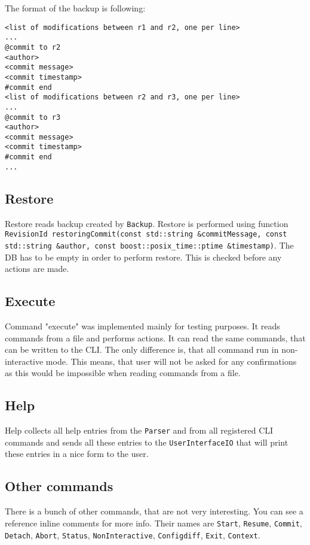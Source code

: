 \documentclass[deska]{subfiles}
\begin{document}
The format of the backup is following:


\begin{verbatim}
<list of modifications between r1 and r2, one per line>
...
@commit to r2
<author>
<commit message>
<commit timestamp>
#commit end
<list of modifications between r2 and r3, one per line>
...
@commit to r3
<author>
<commit message>
<commit timestamp>
#commit end
...
\end{verbatim}

\subsection{Restore}

Restore reads backup created by {\tt Backup}. Restore is performed using function {\tt RevisionId restoringCommit(const
std::string \&commitMessage, const std::string \&author, const boost::posix\_time::ptime \&timestamp)}. The DB has to be empty
in order to perform restore. This is checked before any actions are made.

\subsection{Execute}

Command "execute" was implemented mainly for testing purposes. It reads commands from a file and performs actions. It
can read the same commands, that can be written to the CLI. The only difference is, that all command run in non-interactive
mode. This means, that user will not be asked for any confirmations as this would be impossible when reading commands from
a file.

\subsection{Help}

Help collects all help entries from the {\tt Parser} and from all registered CLI commands and sends all these entries to the
{\tt UserInterfaceIO} that will print these entries in a nice form to the user.

\subsection{Other commands}

There is a bunch of other commands, that are not very interesting. You can see a reference inline comments for more info.
Their names are {\tt Start}, {\tt Resume}, {\tt Commit}, {\tt Detach}, {\tt Abort}, {\tt Status}, {\tt NonInteractive},
{\tt Configdiff}, {\tt Exit}, {\tt Context}.
\end{document}

